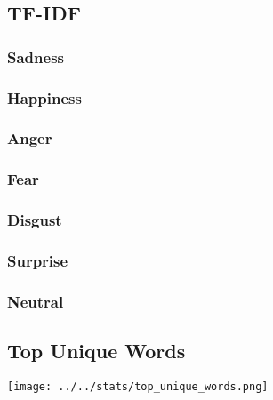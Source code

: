 \documentclass[rnd]{extarticle}
\begin{document}
	
		
		\subsection{TF-IDF}
		\subsubsection{Sadness}
		\begin{center}
		\end{center}
		\subsubsection{Happiness}
		\begin{center}
		\end{center}
		\subsubsection{Anger}
		\begin{center}
		\end{center}
		\subsubsection{Fear}
		\begin{center}
		\end{center}
		\subsubsection{Disgust}
		\begin{center}
		\end{center}
		\subsubsection{Surprise}
		\begin{center}
		\end{center}
		\subsubsection{Neutral}
		\begin{center}
		\end{center}

		
		\subsection{Top Unique Words}
		\texttt{[image: ../../stats/top\_unique\_words.png]}


	
	
	
\end{document}
